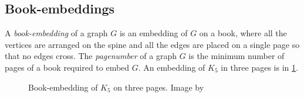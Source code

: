 \subsection{Book-embeddings}
A \textit{book-embedding} of a graph \(G\) is an embedding of \(G\) on a book, where all the vertices are arranged on the spine and all the edges are placed on a single page so that no edges cross. The \textit{pagenumber} of a graph \(G\) is the minimum number of pages of a book required to embed \(G\).
An embedding of $K_5$ in three pages is in \cref{fig:book-embedding}.

\begin{figure}[h!]
	\centering
	
	\caption[Three-page book-embedding of $K_5$]{Book-embedding of $K_5$ on three pages. Image by \textcite{eppsteinBookEmbedding2014}}\label{fig:book-embedding}
\end{figure}